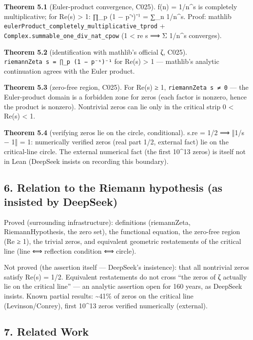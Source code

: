 \documentclass[
]{article}
\begin{document}
\textbf{Theorem 5.1} (Euler-product convergence, C025). f(n) = 1/n\^{}s
is completely multiplicative; for Re(s) \textgreater{} 1: ∏\_p (1 −
p⁻ˢ)⁻¹ = ∑\_n 1/n\^{}s. Proof: mathlib
\texttt{eulerProduct\_completely\_multiplicative\_tprod} +
\texttt{Complex.summable\_one\_div\_nat\_cpow} (1 \textless{} re s ⟹ Σ
1/n\^{}s converges).

\textbf{Theorem 5.2} (identification with mathlib's official ζ, C025).
\texttt{riemannZeta\ s\ =\ ∏\_p\ (1\ −\ p⁻ˢ)⁻¹} for Re(s) \textgreater{}
1 --- mathlib's analytic continuation agrees with the Euler product.

\textbf{Theorem 5.3} (zero-free region, C025). For Re(s) ≥ 1,
\texttt{riemannZeta\ s\ ≠\ 0} --- the Euler-product domain is a
forbidden zone for zeros (each factor is nonzero, hence the product is
nonzero). Nontrivial zeros can lie only in the critical strip 0
\textless{} Re(s) \textless{} 1.

\textbf{Theorem 5.4} (verifying zeros lie on the circle, conditional).
s.re = 1/2 ⟹ ‖1/s − 1‖ = 1: numerically verified zeros (real part 1/2,
external fact) lie on the critical-line circle. The external numerical
fact (the first 10\^{}13 zeros) is itself not in Lean (DeepSeek insists
on recording this boundary).

\subsection{6. Relation to the Riemann hypothesis (as insisted by
DeepSeek)}\label{relation-to-the-riemann-hypothesis-as-insisted-by-deepseek}

Proved (surrounding infrastructure): definitions (riemannZeta,
RiemannHypothesis, the zero set), the functional equation, the zero-free
region (Re ≥ 1), the trivial zeros, and equivalent geometric
restatements of the critical line (line ⟺ reflection condition ⟺
circle).

Not proved (the assertion itself --- DeepSeek's insistence): that all
nontrivial zeros satisfy Re(s) = 1/2. Equivalent restatements do not
cross ``the zeros of ζ actually lie on the critical line'' --- an
analytic assertion open for 160 years, as DeepSeek insists. Known
partial results: \textasciitilde41\% of zeros on the critical line
(Levinson/Conrey), first 10\^{}13 zeros verified numerically (external).

\subsection{7. Related Work}\label{related-work}
\end{document}
